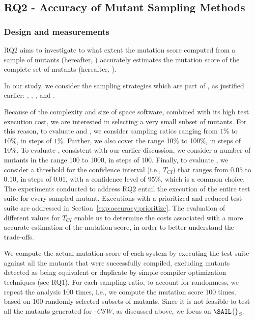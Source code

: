 \subsection{RQ2 - Accuracy of Mutant Sampling Methods}
\label{sec:RQ2}
\subsubsection{Design and measurements}


RQ2 aims to investigate
to what extent the mutation score computed from a sample of mutants (hereafter, ) accurately estimates the mutation score of the complete set of mutants (hereafter, ).

In our study, we consider the sampling strategies which are part of \APPR, as justified earlier: , ,  , and .


Because of the complexity and size of space software, combined with its high test execution cost, we are interested in selecting a very small subset of mutants.
For this reason,
to evaluate   and ,
we consider sampling ratios ranging from $1\%$ to $10\%$, in steps of $1\%$. Further,
 we also cover the range 10\% to 100\%, in steps of $10\%$. To evaluate  , consistent with our earlier discussion, we consider a number of mutants in the range 100 to 1000, in steps of $100$.
Finally, to evaluate , we consider a threshold for the confidence interval (i.e., $T_{\mathit{CI}}$) that ranges from $0.05$ to $0.10$, in steps of $0.01$, with a confidence level of $95\%$, which is a common choice. The experiments conducted to address RQ2 entail the execution of the entire test suite for every sampled mutant. Executions with a prioritized and reduced test suite are addressed in Section~\ref{exp:accuracy:prioritize}. The evaluation of different values for $T_{\mathit{CI}}$ enable us to determine the costs associated with a more accurate estimation of the mutation score, in order to better understand the trade-offs.


We compute the actual mutation score of each system by executing the test suite against all the mutants that were successfully compiled, excluding mutants detected as being equivalent or duplicate by simple compiler optimization techniques (see RQ1).
For each sampling ratio, to account for randomness,
we repeat the analysis 100 times, i.e., we compute the mutation score 100 times, based on 100 randomly selected subsets of mutants.
Since it is not feasible to test all the mutants generated for \SAIL{}\emph{-CSW}, as discussed above, we focus on $\mathit{\SAIL{}}_{S}$.



